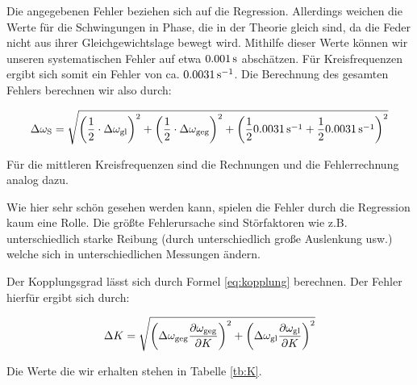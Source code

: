 Die angegebenen Fehler beziehen sich auf die Regression. Allerdings weichen die Werte für die Schwingungen in Phase, die in der Theorie gleich sind, da die Feder nicht aus ihrer Gleichgewichtslage bewegt wird. Mithilfe dieser Werte können wir unseren systematischen Fehler auf etwa $\unit[0.001]{s}$ abschätzen. Für Kreisfrequenzen ergibt sich somit ein Fehler von ca. $\unit[0.0031]{s^{-1}}$. Die Berechnung des gesamten Fehlers berechnen wir also durch:

\begin{equation*}
\Delta \omega_\n{S} = \sqrt{
\left(\frac{1}{2} \cdot \Delta\omega_\n{gl}\right)^2
+ 
\left(\frac{1}{2} \cdot \Delta\omega_\n{geg}\right)^2
+
\left(\frac12 \unit[0.0031]{s^{-1}} + \frac12 \unit[0.0031]{s^{-1}} \right)^2
}
\end{equation*}

Für die mittleren Kreisfrequenzen sind die Rechnungen und die Fehlerrechnung analog dazu.

Wie hier sehr schön gesehen werden kann, spielen die Fehler durch die Regression kaum eine Rolle. Die größte Fehlerursache sind Störfaktoren wie z.B. unterschiedlich starke Reibung (durch unterschiedlich große Auslenkung usw.) welche sich in unterschiedlichen Messungen ändern.

Der Kopplungsgrad lässt sich durch Formel \ref{eq:kopplung} berechnen. Der Fehler hierfür ergibt sich durch:

\begin{equation*}
\Delta K = \sqrt{
\left(\Delta \omega_{\mathrm{geg}}\frac{\partial \omega_{\mathrm{geg}}}{\partial K}\right)^2
+
\left(\Delta \omega_{\mathrm{gl}}\frac{\partial \omega_{\mathrm{gl}}}{\partial K}\right)^2
}
\end{equation*}

Die Werte die wir erhalten stehen in Tabelle \ref{tb:K}.

\begin{table}[t]
\caption{Die berechnetet Werte für den Kopplungsgrad $K$}
\label{tb:K}
\end{table}


